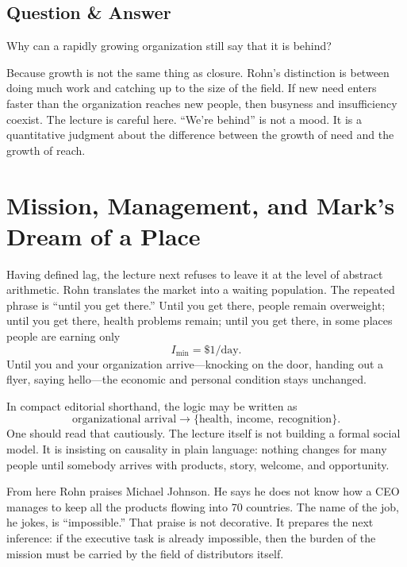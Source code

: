 \subsection{Question \& Answer}

Why can a rapidly growing organization still say that it is behind?

Because growth is not the same thing as closure. Rohn's distinction is between doing much work and catching up to the size of the field. If new need enters faster than the organization reaches new people, then busyness and insufficiency coexist. The lecture is careful here. ``We're behind'' is not a mood. It is a quantitative judgment about the difference between the growth of need and the growth of reach.

\section{Mission, Management, and Mark's Dream of a Place}

Having defined lag, the lecture next refuses to leave it at the level of abstract arithmetic. Rohn translates the market into a waiting population. The repeated phrase is ``until you get there.'' Until you get there, people remain overweight; until you get there, health problems remain; until you get there, in some places people are earning only
\begin{equation}
I_{\min}=\$1/\text{day}.
\end{equation}
Until you and your organization arrive---knocking on the door, handing out a flyer, saying hello---the economic and personal condition stays unchanged.

In compact editorial shorthand, the logic may be written as
\begin{equation}
\text{organizational arrival} \to \{\text{health},\ \text{income},\ \text{recognition}\}.
\end{equation}
One should read that cautiously. The lecture itself is not building a formal social model. It is insisting on causality in plain language: nothing changes for many people until somebody arrives with products, story, welcome, and opportunity.

From here Rohn praises Michael Johnson. He says he does not know how a CEO manages to keep all the products flowing into 70 countries. The name of the job, he jokes, is ``impossible.'' That praise is not decorative. It prepares the next inference: if the executive task is already impossible, then the burden of the mission must be carried by the field of distributors itself.

